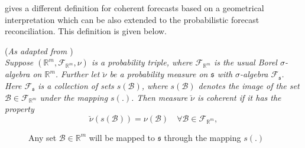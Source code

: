 \documentclass[graybox]{svmult}
\begin{document}
\cite{Gamakumara2018} gives a different definition for coherent forecasts based on a geometrical interpretation which can be also extended to the probabilistic forecast reconciliation. This definition is given below. 


\begin{definition}(\textit{As adapted from \cite{Gamakumara2018} })\label{def:cohprob}\\
	
	\textit{Suppose $(\mathbb{R}^m, \mathscr{F}_{\mathbb{R}^m}, \nu)$ is a probability triple, where $\mathscr{F}_{\mathbb{R}^m}$ is the usual Borel $\sigma$-algebra on $\mathbb{R}^m$. Further let $\breve{\nu}$ be a probability measure on $\mathfrak{s}$ with $\sigma$-algebra $\mathscr{F}_{\mathfrak{s}}$. Here $\mathscr{F}_{\mathfrak{s}}$ is a collection of sets $s(\mathcal{B})$, where $s(\mathcal{B})$ denotes the image of the set $\mathcal{B}\in \mathscr{F}_{\mathbb{R}^m}$ under the mapping $s(.)$. 
	Then measure $\breve{\nu}$ is coherent if it has the property
	\[
	\breve{\nu}(s(\mathcal{B})) = \nu(\mathcal{B}) \quad \forall \mathcal{B} \in \mathscr{F}_{\mathbb{R}^m},
	\]}
\end{definition}

\begin{figure}[b]
	\begin{center}
			\newline
			
		\caption{Any set $\mathcal{B} \in \mathbb{R}^m$ will be mapped to $\mathfrak{s}$ through the mapping $s(.)$}\label{fig2}
	\end{center}
\end{figure}
\end{document}
